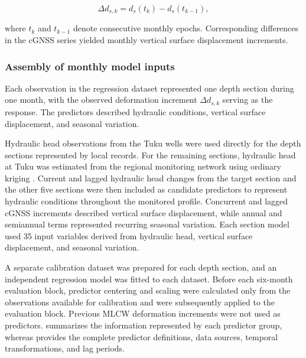 \begin{equation}
\Delta d_{s,k}
=
d_s(t_k)-d_s(t_{k-1}),
\label{eq:monthly_deformation_increment}
\end{equation}

where $t_k$ and $t_{k-1}$ denote consecutive monthly epochs. Corresponding differences in the cGNSS series yielded monthly vertical surface displacement increments.

\subsubsection{Assembly of monthly model inputs}

Each observation in the regression dataset represented one depth section during one month, with the observed deformation increment $\Delta d_{s,k}$ serving as the response. The predictors described hydraulic conditions, vertical surface displacement, and seasonal variation.

Hydraulic head observations from the Tuku wells were used directly for the depth sections represented by local records. For the remaining sections, hydraulic head at Tuku was estimated from the regional monitoring network using ordinary kriging \citep{theodossiou2006}. Current and lagged hydraulic head changes from the target section and the other five sections were then included as candidate predictors to represent hydraulic conditions throughout the monitored profile. Concurrent and lagged cGNSS increments described vertical surface displacement, while annual and semiannual terms represented recurring seasonal variation. Each section model used 35 input variables derived from hydraulic head, vertical surface displacement, and seasonal variation.

A separate calibration dataset was prepared for each depth section, and an independent regression model was fitted to each dataset. Before each six-month evaluation block, predictor centering and scaling were calculated only from the observations available for calibration and were subsequently applied to the evaluation block. Previous MLCW deformation increments were not used as predictors.  summarizes the information represented by each predictor group, whereas  provides the complete predictor definitions, data sources, temporal transformations, and lag periods.

